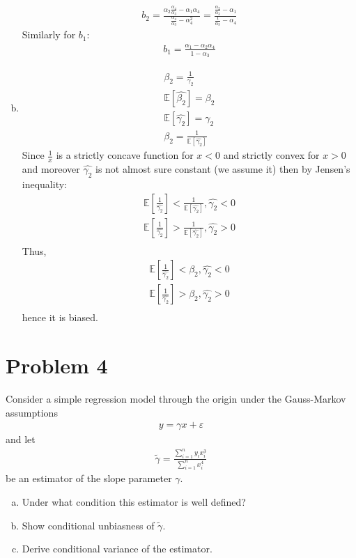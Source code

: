 \documentclass[a4paper]{article}
\newcommand{\expect}{\mathbb{E}}
\newcommand{\summa}{\sum_{i=1}^n}
\begin{document}
\begin{enumerate}[(a)]
	\begin{align*}
	b_2 = \frac{\alpha_2\frac{\alpha_4}{\alpha_3} - \alpha_1\alpha_4}{\frac{\alpha_4}{\alpha_3} - \alpha_4^2} = \frac{\frac{\alpha_2}{\alpha_3} - \alpha_1}{\frac{1}{\alpha_3} - \alpha_4}
	\end{align*}
	Similarly for $b_1$:
	\begin{align*}
	b_1 = \frac{\alpha_1 - \alpha_2 \alpha_4}{1 - \alpha_3}
	\end{align*}
	\item 
	\begin{align*}
	\beta_2 = \frac{1}{\gamma_2}\\
	\expect[\hat{\beta_2}] = \beta_2\\
	\expect[\hat{\gamma_2}] = \gamma_2\\
	\beta_2 = \frac{1}{\expect[\hat{\gamma_2}]}
	\end{align*}
	Since $\frac{1}{x}$ is a strictly concave function for $x < 0$ and strictly convex for $x > 0$ and moreover $\hat{\gamma_2}$ is not almost sure constant (we assume it) then by Jensen's inequality:
	\begin{align*}
	\expect\left[\frac{1}{\hat{\gamma_2}}\right] < \frac{1}{\expect[\hat{\gamma_2}]}, \hat{\gamma_2} < 0\\
	\expect\left[\frac{1}{\hat{\gamma_2}}\right] > \frac{1}{\expect[\hat{\gamma_2}]}, \hat{\gamma_2} > 0\\
	\end{align*}
	Thus, 
	\begin{align*}
	\expect\left[\frac{1}{\hat{\gamma_2}}\right] < \beta_2, \hat{\gamma_2} < 0\\
	\expect\left[\frac{1}{\hat{\gamma_2}}\right] > \beta_2, \hat{\gamma_2} > 0\\
	\end{align*}
	hence it is biased.
\end{enumerate}
\section*{Problem 4}
Consider a simple regression model through the origin under the Gauss-Markov assumptions
\begin{align*}
y = \gamma x + \varepsilon
\end{align*}
and let
\begin{align*}
\tilde{\gamma} = \frac{\summa y_ix_i^3}{\summa x_i^4}
\end{align*}
be an estimator of the slope parameter $\gamma$.
\begin{enumerate}[(a)]
\item Under what condition this estimator is well defined?
\item Show conditional unbiasness of $\tilde{\gamma}$.
\item Derive conditional variance of the estimator.
\end{enumerate}
\end{document}
